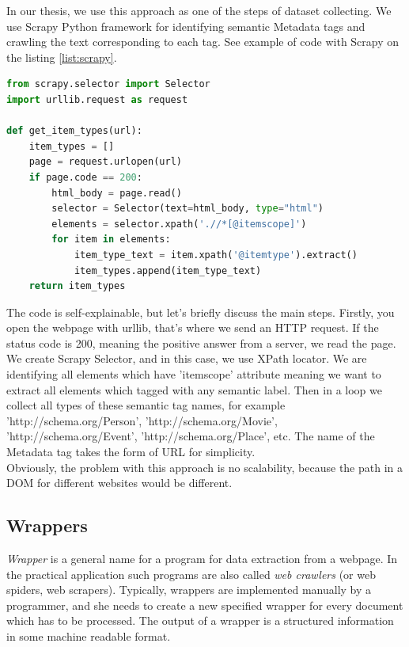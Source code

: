 In our thesis, we use this approach as one of the steps of dataset collecting. We use Scrapy Python framework\cite{Scrapy} for identifying semantic Metadata tags and crawling the text corresponding to each tag. See example of code with Scrapy on the listing \ref{list:scrapy}.\\

\begin{lstlisting}[language=Python, caption={Example of meta tag text scrapping with Scrapy Python framework}, label={list:scrapy}, captionpos=b]
from scrapy.selector import Selector
import urllib.request as request

def get_item_types(url):
    item_types = []
    page = request.urlopen(url)
    if page.code == 200:
        html_body = page.read()
        selector = Selector(text=html_body, type="html")
        elements = selector.xpath('.//*[@itemscope]')
        for item in elements:
            item_type_text = item.xpath('@itemtype').extract()
            item_types.append(item_type_text)
    return item_types 
\end{lstlisting}

The code is self-explainable, but let's briefly discuss the main steps. Firstly, you open the webpage with urllib, that's where we send an HTTP request. If the status code is 200, meaning the positive answer from a server, we read the page. We create Scrapy Selector, and in this case, we use XPath locator. We are identifying all elements which have 'itemscope' attribute meaning we want to extract all elements which tagged with any semantic label. Then in a loop we collect all types of these semantic tag names, for example 'http://schema.org/Person', 'http://schema.org/Movie', 'http://schema.org/Event', 'http://schema.org/Place', etc. The name of the Metadata tag takes the form of URL for simplicity. \\

Obviously, the problem with this approach is no scalability, because the path in a DOM for different websites would be different. \\

\subsection{Wrappers}

\textit{Wrapper} is a general name for a program for data extraction from a webpage. In the practical application such programs are also called \textit{web crawlers} (or web spiders, web scrapers). Typically, wrappers are implemented manually by a programmer, and she needs to create a new specified wrapper for every document which has to be processed. The output of a wrapper is a structured information in some machine readable format. \\

